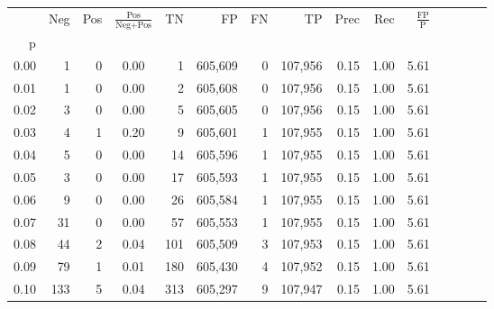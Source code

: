\begin{tabular}{rrrcrrrrrrrrrrr}
\toprule
{} &     Neg &    Pos & $\frac{\text{Pos}}{\text{Neg}+\text{Pos}}$ &       TN &       FP &       FN &       TP &  Prec &   Rec & $\frac{\text{FP}}{\text{P}}$ \\
p    &         &        &                                            &          &          &          &          &       &       &                              \\
\midrule
0.00 &       1 &      0 &                                       0.00 &        1 &  605,609 &        0 &  107,956 &  0.15 &  1.00 &                         5.61 \\
0.01 &       1 &      0 &                                       0.00 &        2 &  605,608 &        0 &  107,956 &  0.15 &  1.00 &                         5.61 \\
0.02 &       3 &      0 &                                       0.00 &        5 &  605,605 &        0 &  107,956 &  0.15 &  1.00 &                         5.61 \\
0.03 &       4 &      1 &                                       0.20 &        9 &  605,601 &        1 &  107,955 &  0.15 &  1.00 &                         5.61 \\
0.04 &       5 &      0 &                                       0.00 &       14 &  605,596 &        1 &  107,955 &  0.15 &  1.00 &                         5.61 \\
0.05 &       3 &      0 &                                       0.00 &       17 &  605,593 &        1 &  107,955 &  0.15 &  1.00 &                         5.61 \\
0.06 &       9 &      0 &                                       0.00 &       26 &  605,584 &        1 &  107,955 &  0.15 &  1.00 &                         5.61 \\
0.07 &      31 &      0 &                                       0.00 &       57 &  605,553 &        1 &  107,955 &  0.15 &  1.00 &                         5.61 \\
0.08 &      44 &      2 &                                       0.04 &      101 &  605,509 &        3 &  107,953 &  0.15 &  1.00 &                         5.61 \\
0.09 &      79 &      1 &                                       0.01 &      180 &  605,430 &        4 &  107,952 &  0.15 &  1.00 &                         5.61 \\
0.10 &     133 &      5 &                                       0.04 &      313 &  605,297 &        9 &  107,947 &  0.15 &  1.00 &                         5.61 \\

\end{tabular}
